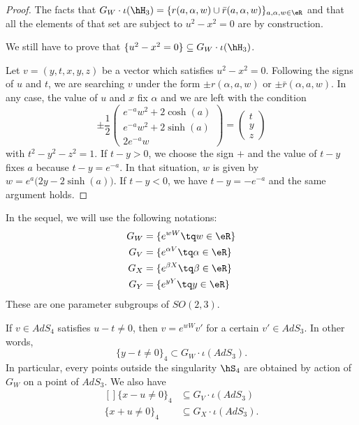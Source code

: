 \begin{proof}
The facts that $G_W\cdot\iota(\hH_3)=\{ r(a,\alpha,w)\cup\bar r(a,\alpha,w) \}_{a,\alpha,w\in\eR}$ and that all the elements of that set are subject to $u^2-x^2=0$ are by construction.

We still have to prove that $\{ u^2-x^2=0\}\subseteq G_W\cdot\iota(\hH_3)$.

Let $v=(y,t,x,y,z)$ be a vector which satisfies $u^2-x^2=0$. Following the signs of $u$ and $t$, we are searching $v$ under the form $\pm r(\alpha,a,w)$ or $\pm \bar r(\alpha,a,w)$. In any case, the value of $u$ and $x$ fix $\alpha$ and we are left with the condition
\begin{equation}
\pm\frac{ 1 }{2}
	\begin{pmatrix}
	e^{-a}w^2+2\cosh(a)	\\
	e^{-a}w^2+2\sinh(a)	\\
	2 e^{-a}w
\end{pmatrix}
=
\begin{pmatrix}
	t	\\
	y	\\
	z
\end{pmatrix}
\end{equation}
with $t^2-y^2-z^2=1$.  If $t-y>0$, we choose the sign $+$ and the value of $t-y$ fixes $a$ because $t-y= e^{-a}$. In that situation, $w$ is given by $w= e^{a}\big(2y-2\sinh(a)\big)$. If $t-y<0$, we have $t-y=- e^{-a}$ and the same argument holds.

\end{proof}

In the sequel, we will use the following notations:
\begin{equation}
	\begin{aligned}[]
		G_W&=\{  e^{wW}\tq w\in\eR \}\\
		G_V&=\{  e^{\alpha V}\tq \alpha\in\eR \}\\
		G_X&=\{  e^{\beta X}\tq \beta\in\eR \}\\
		G_Y&=\{  e^{y Y}\tq y\in\eR \}
	\end{aligned}
\end{equation}
These are one parameter subgroups of $SO(2,3)$.

\begin{proposition}		\label{PropInclusionsTroisQuatreWVXY}
If $v\in AdS_4$ satisfies $u-t\neq 0$, then $v= e^{wW}v'$ for a certain $v'\in AdS_3$. In other words,
\begin{equation}
	\{ y-t\neq 0 \}_4\subset G_W\cdot\iota(AdS_3).
\end{equation}
In particular, every points outside the singularity $\hS_4$ are obtained by action of $G_W$ on a point of $AdS_3$. We also have
\begin{equation}
	\begin{aligned}[]
		\{ x-u\neq 0 \}_4&\subseteq G_V\cdot\iota(AdS_3)\\
		\{ x+u\neq 0 \}_4&\subseteq G_X\cdot\iota(AdS_3).
	\end{aligned}
\end{equation}
\end{proposition}

